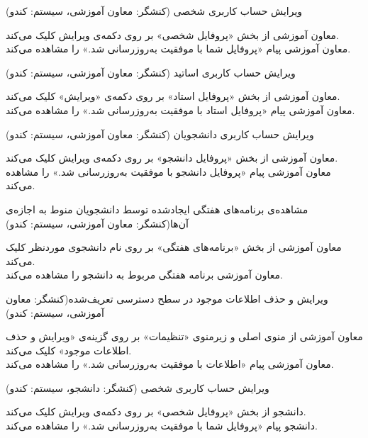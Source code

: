 \documentclass{report}
\begin{document}
\textbf{}
ویرایش حساب کاربری شخصی (کنشگر: معاون آموزشی، سیستم: کندو)\begin{addmargin}[.84cm]{0cm}
معاون آموزشی از بخش «پروفایل شخصی» بر روی دکمه‌ی ویرایش کلیک می‌کند.\\
معاون آموزشی پیام «پروفایل شما با موفقیت به‌روزرسانی شد.» را مشاهده می‌کند.
\end{addmargin}

\textbf{}
ویرایش حساب کاربری اساتید (کنشگر: معاون آموزشی، سیستم: کندو)\begin{addmargin}[.84cm]{0cm}
معاون آموزشی از بخش «پروفایل استاد» بر روی دکمه‌ی «ویرایش» کلیک می‌کند.\\
معاون آموزشی پیام «پروفایل استاد با موفقیت به‌روزرسانی شد.» را مشاهده می‌کند.
\end{addmargin}

\textbf{}
ویرایش حساب کاربری دانشجویان (کنشگر: معاون آموزشی، سیستم: کندو)
\begin{addmargin}[.84cm]{0cm}
معاون آموزشی از بخش «پروفایل دانشجو» بر روی دکمه‌ی ویرایش کلیک می‌کند.\\
معاون آموزشی پیام «پروفایل دانشجو با موفقیت به‌روزرسانی شد.» را مشاهده می‌کند.
\end{addmargin}

\textbf{}
مشاهده‌ی برنامه‌های هفتگی ایجادشده توسط دانشجویان منوط به اجازه‌ی آن‌ها(کنشگر: معاون آموزشی، سیستم: کندو)
\begin{addmargin}[.84cm]{0cm}
معاون آموزشی از بخش «برنامه‌های هفتگی» بر روی نام دانشجوی موردنظر کلیک می‌کند.\\
معاون آموزشی برنامه هفتگی مربوط به دانشجو را مشاهده می‌کند.
\end{addmargin}

\textbf{}
ویرایش و حذف اطلاعات موجود در سطح دسترسی تعریف‌شده(کنشگر: معاون آموزشی، سیستم: کندو)
\begin{addmargin}[.84cm]{0cm}
معاون آموزشی از منوی اصلی و زیرمنوی «تنظیمات» بر روی گزینه‌ی «ویرایش و حذف اطلاعات موجود» کلیک می‌کند.\\
معاون آموزشی پیام «اطلاعات با موفقیت به‌روزرسانی شد.» را مشاهده می‌کند.
\end{addmargin}

\textbf{}
ویرایش حساب کاربری شخصی (کنشگر: دانشجو، سیستم: کندو)
\begin{addmargin}[.84cm]{0cm}
دانشجو از بخش «پروفایل شخصی» بر روی دکمه‌ی ویرایش کلیک می‌کند.\\
دانشجو پیام «پروفایل شما با موفقیت به‌روزرسانی شد.» را مشاهده می‌کند.
\end{addmargin}
\end{document}
